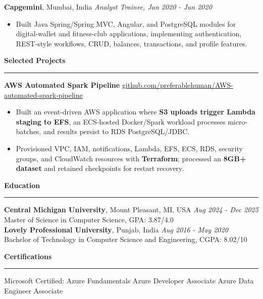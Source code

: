 \documentclass[11pt,letterpaper]{article}
\newcommand{\ressection}[1]{\Needspace{6\baselineskip}\vspace{8pt}\par\textbf{#1}\par\vspace{2pt}\hrule\vspace{5pt}}
\begin{document}
\textbf{Capgemini}, Mumbai, India \hfill \textit{Analyst Trainee, Jan 2020 - Jun 2020}
\begin{itemize}
  \item Built Java Spring/Spring MVC, Angular, and PostgreSQL modules for digital-wallet and fitness-club applications, implementing authentication, REST-style workflows, CRUD, balances, transactions, and profile features.
\end{itemize}

\ressection{Selected Projects}
\textbf{AWS Automated Spark Pipeline} \hfill \href{https://github.com/preferablehuman/AWS-automated-spark-pipeline}{github.com/preferablehuman/AWS-automated-spark-pipeline}
\begin{itemize}
  \item Built an event-driven AWS application where \textbf{S3 uploads trigger Lambda staging to EFS}, an ECS-hosted Docker/Spark workload processes micro-batches, and results persist to RDS PostgreSQL/JDBC.
  \item Provisioned VPC, IAM, notifications, Lambda, EFS, ECS, RDS, security groups, and CloudWatch resources with \textbf{Terraform}; processed an \textbf{8GB+ dataset} and retained checkpoints for restart recovery.
\end{itemize}

\ressection{Education}
\textbf{Central Michigan University}, Mount Pleasant, MI, USA \hfill \textit{Aug 2024 - Dec 2025}\\
Master of Science in Computer Science, GPA: 3.87/4.0\\[2pt]
\textbf{Lovely Professional University}, Punjab, India \hfill \textit{Aug 2016 - May 2020}\\
Bachelor of Technology in Computer Science and Engineering, CGPA: 8.02/10

\ressection{Certifications}
Microsoft Certified: Azure Fundamentals \textbar{} Azure Developer Associate \textbar{} Azure Data Engineer Associate
\end{document}
